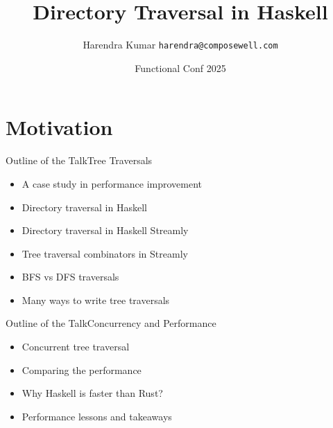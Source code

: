 \documentclass[17pt]{beamer}
\title[Haskell Streamly]{Directory Traversal in Haskell}
\author{Harendra Kumar \texttt{harendra@composewell.com}}
\institute{Composewell Technologies}
\date{\small Functional Conf 2025}
\begin{document}

\begin{frame}
  \titlepage
\end{frame}


\section{Motivation}

\begin{frame}{Outline of the Talk}{Tree Traversals}
\begin{itemize}
  \item A case study in performance improvement
  \item Directory traversal in Haskell
  \item Directory traversal in Haskell Streamly
  \item Tree traversal combinators in Streamly
  \item BFS vs DFS traversals
  \item Many ways to write tree traversals
\end{itemize}
\end{frame}

\begin{frame}{Outline of the Talk}{Concurrency and Performance}
\begin{itemize}
  \item Concurrent tree traversal
  \item Comparing the performance %
  \item Why Haskell is faster than Rust?
  \item Performance lessons and takeaways
\end{itemize}
\end{frame}
\end{document}
